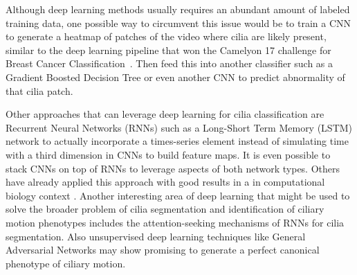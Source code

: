 Although deep learning methods usually requires an abundant amount of labeled training data, one possible way to circumvent this issue would be to train a CNN to generate a heatmap of patches of the video where cilia are likely present, similar to the deep learning pipeline that won the Camelyon 17 challenge for Breast Cancer Classification~\cite{wang2016deep}. Then feed this into another classifier such as a Gradient Boosted Decision Tree or even another CNN to predict abnormality of that cilia patch.
 
Other approaches that can leverage deep learning for cilia classification are Recurrent Neural Networks (RNNs) such as a Long-Short Term Memory (LSTM) network to actually incorporate a times-series element instead of simulating time with a third dimension in CNNs to build feature maps. It is even possible to stack CNNs on top of RNNs to leverage aspects of both network types. Others have already applied this approach with good results in a in computational biology context \cite{sonderby2015convolutional}. Another interesting area of deep learning that might be used to solve the broader problem of cilia segmentation and identification of ciliary motion phenotypes includes the attention-seeking mechanisms of RNNs for cilia segmentation. Also unsupervised deep learning techniques like General Adversarial Networks may show promising to generate a perfect canonical phenotype of ciliary motion.


